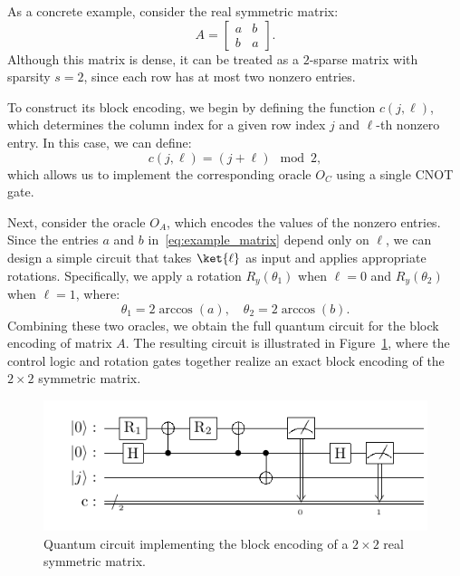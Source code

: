 \documentclass{article}
\begin{document}
    As a concrete example, consider the real symmetric matrix:
    \begin{equation}
        A =
        \begin{bmatrix}
            a & b \\
            b & a
        \end{bmatrix}.\label{eq:example_matrix}
    \end{equation}
    Although this matrix is dense, it can be treated as a $2$-sparse matrix with sparsity $s = 2$, since each row has at most two nonzero entries.

    To construct its block encoding, we begin by defining the function $c(j, \ell)$, which determines the column index for a given row index $j$ and $\ell$-th nonzero entry. In this case, we can define:
    \begin{equation}
        c(j,\ell) = (j + \ell) \mod 2,\label{eq:equation12}
    \end{equation}
    which allows us to implement the corresponding oracle $O_C$ using a single CNOT gate.

    Next, consider the oracle $O_A$, which encodes the values of the nonzero entries. Since the entries $a$ and $b$ in~\eqref{eq:example_matrix} depend only on $\ell$, we can design a simple circuit that takes $\ket{\ell}$ as input and applies appropriate rotations. Specifically, we apply a rotation $R_y(\theta_1)$ when $\ell = 0$ and $R_y(\theta_2)$ when $\ell = 1$, where:
    \begin{equation}
        \theta_1 = 2\arccos(a), \quad \theta_2 = 2\arccos(b).
    \end{equation}
    Combining these two oracles, we obtain the full quantum circuit for the block encoding of matrix $A$. The resulting circuit is illustrated in Figure~\ref{fig:2x2_circuit}, where the control logic and rotation gates together realize an exact block encoding of the $2 \times 2$ symmetric matrix.

    \begin{figure}[htbp]
        \centering
        \includegraphics{pdf/2x2_circuit}
        \caption{Quantum circuit implementing the block encoding of a $2\times2$ real symmetric matrix.}
        \label{fig:2x2_circuit}
    \end{figure}
\end{document}
